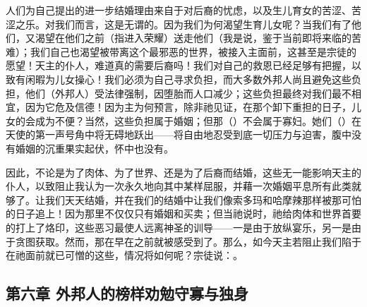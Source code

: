 人们为自己提出的进一步结婚理由来自于对后裔的忧虑，以及生儿育女的苦涩、苦涩之乐。对我们而言，这是无谓的。因为我们为何渴望生育儿女呢？当我们有了他们，又渴望在他们之前（指进入荣耀）送走他们（我是说，鉴于当前即将来临的苦难）；我们自己也渴望被带离这个最邪恶的世界，被接入主面前，这甚至是宗徒的愿望！天主的仆人，难道真的需要后裔吗！我们对自己的救恩已经足够有把握，以致有闲暇为儿女操心！我们必须为自己寻求负担，而大多数外邦人尚且避免这些负担，他们（外邦人）受法律强制，因堕胎而人口减少；这些负担最终对我们最不相宜，因为它危及信德！因为主为何预言，除非祂见证，在那个卸下重担的日子，儿女的会成为不便？当然，这些负担属于婚姻；但那（）不会属于寡妇。她们（）在天使的第一声号角中将无碍地跃出——将自由地忍受到底一切压力与迫害，腹中没有婚姻的沉重果实起伏，怀中也没有。\par

因此，不论是为了肉体、为了世界、还是为了后裔而结婚，这些无一能影响天主的仆人，以致阻止我认为一次永久地向其中某样屈服，并藉一次婚姻平息所有此类就够了。让我们天天结婚，并在我们的结婚中让我们像索多玛和哈摩辣那样被那可怕的日子追上！因为那里不仅仅只有婚姻和买卖；但当祂说时，祂给肉体和世界首要的打上了烙印，这些恶习最使人远离神圣的训导——一是由于放纵宴乐，另一是由于贪图获取。然而，那在早在之前就被感受到了。那么，如今天主若阻止我们陷于在祂面前就已可憎的这些，情况将如何呢？宗徒说：。\par


\subsection{第六章 外邦人的榜样劝勉守寡与独身}


